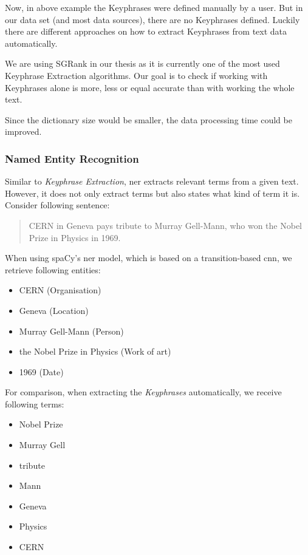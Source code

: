 Now, in above example the Keyphrases were defined manually by a user.
But in our data set (and most data sources), there are no Keyphrases defined.
Luckily there are different approaches on how to extract Keyphrases from text data automatically.

We are using SGRank\cite{SGRank} in our thesis as it is currently one of the most used Keyphrase Extraction algorithms.
Our goal is to check if working with Keyphrases alone is more, less or equal accurate
than with working the whole text.

Since the dictionary size would be smaller, the data processing time could be improved.

\subsubsection{Named Entity Recognition}
\label{subsubsec:3_named_entity_recognition}

Similar to \textit{Keyphrase Extraction}, \Gls{ner} extracts relevant terms from a given text.
However, it does not only extract terms but also states what kind of term it is.
Consider following sentence:

\begin{quotation}
    CERN in Geneva pays tribute to Murray Gell-Mann, who won the Nobel Prize in Physics in 1969.
\end{quotation}

When using spaCy's \gls{ner} model, which is based on a transition-based \gls{cnn}\cite{LampleBSKD16},
we retrieve following entities:

\begin{itemize}
    \item CERN (Organisation)
    \item Geneva (Location)
    \item Murray Gell-Mann (Person)
    \item the Nobel Prize in Physics (Work of art)
    \item 1969 (Date)
\end{itemize}

For comparison, when extracting the \textit{Keyphrases} automatically, we receive following terms:

\begin{itemize}
    \item Nobel Prize
    \item Murray Gell
    \item tribute
    \item Mann
    \item Geneva
    \item Physics
    \item CERN
\end{itemize}

